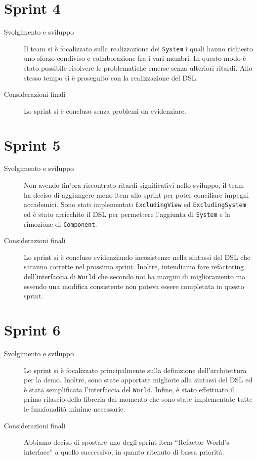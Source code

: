 \section{Sprint 4}\label{sec:sprint-4}
\begin{description}
    \item[Svolgimento e sviluppo] Il team si è focalizzato sulla realizzazione dei \texttt{System} i quali hanno richiesto uno sforzo condiviso e collaborazione fra i vari membri.
    In questo modo
    è stato possibile risolvere le problematiche emerse senza ulteriori ritardi.
    Allo stesso tempo si è proseguito con la realizzazione del DSL\@.
    \item[Considerazioni finali] Lo sprint si è concluso senza problemi da evidenziare.
\end{description}
\section{Sprint 5}\label{sec:sprint-5}
\begin{description}
    \item[Svolgimento e sviluppo] Non avendo fin'ora riscontrato ritardi significativi nello sviluppo, il team ha deciso di aggiungere meno item allo sprint per poter conciliare impegni accademici.
    Sono stati implementati \texttt{ExcludingView} ed \texttt{ExcludingSystem} ed è stato arricchito il DSL per permettere l'aggiunta di \texttt{System} e la rimozione di \texttt{Component}.
    \item[Considerazioni finali] Lo sprint si è concluso evidenziando incosistenze nella sintassi del DSL che saranno corrette nel prossimo sprint.
    Inoltre, intendiamo fare refactoring dell'interfaccia di \texttt{World} che secondo noi ha margini di miglioramento ma essendo una modifica consistente non poteva essere completata in questo sprint.
\end{description}
\section{Sprint 6}\label{sec:sprint-6}
\begin{description}
    \item[Svolgimento e sviluppo] Lo sprint si è focalizzato principalmente sulla definizione dell'architettura per la demo.
    Inoltre, sono state apportate migliorie alla sintassi del DSL ed è stata semplificata l'interfaccia del \texttt{World}.
    Infine, è stato effettuato il primo rilascio della libreria dal momento che sono state implementate tutte le funzionalità minime necessarie.
    \item[Considerazioni finali] Abbiamo deciso di spostare uno degli sprint item ``Refactor World's interface'' a quello successivo, in quanto ritenuto di bassa priorità.
\end{description}
